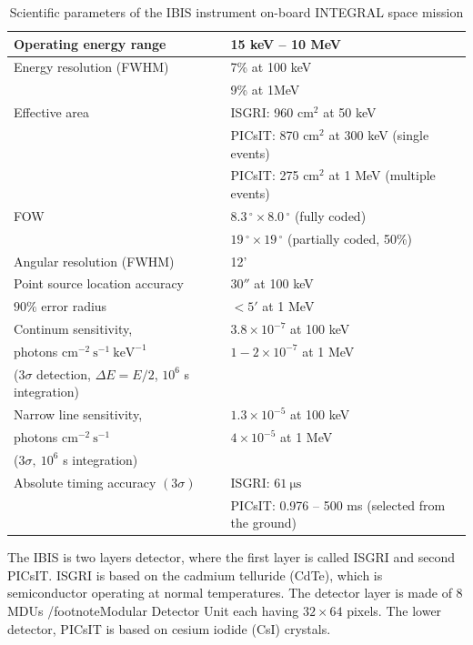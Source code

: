 \documentclass[oneside,a4paper,11pt]{report}
\begin{document}
\begin{table}[hbt!]\footnotesize
\begin{center}
\caption{Scientific parameters of the IBIS instrument on-board INTEGRAL space mission}
\begin{tabular}{|l|l|}
\hline
Operating energy range     & 15 keV -- 10 MeV\\
\hline
Energy resolution (FWHM)   & 7\% at 100 keV\\
                           & 9\% at 1MeV  \\
\hline
Effective area             & ISGRI: 960 $\mathrm{cm^2}$ at 50 keV \\
                           & PICsIT: 870 $\mathrm{cm^2}$ at 300 keV (single events)\\
                           & PICsIT: 275 $\mathrm{cm^2}$ at 1 MeV (multiple events)\\
\hline
FOW                        &$8.3\,^{\circ} \times 8.0\,^{\circ}$ (fully coded) \\
                           &$19\,^{\circ} \times 19\,^{\circ}$ (partially coded, 50\%)\\
\hline
Angular resolution (FWHM)  & 12' \\
\hline
Point source location accuracy & $30''$ at 100 keV \\
$90\%$ error radius      & $<5'$ at 1 MeV \\
\hline
Continum sensitivity, & $3.8 \times 10^{-7}$ at 100 keV \\
photons $\mathrm{cm^{-2}\: s^{-1}\: keV^{-1}}$ & $1 - 2 \times 10^{-7}$ at 1 MeV \\
($3 \sigma$ detection, $\Delta E = E/2$, $10^6$ s integration) &  \\
\hline
Narrow line sensitivity, & $1.3 \times 10^{-5}$ at 100 keV \\
photons $\mathrm{cm^{-2}\: s^{-1}}$ & $4 \times 10^{-5}$ at 1 MeV \\
($3\sigma,\:10^6$ s integration)&  \\
\hline
Absolute timing accuracy $(3 \sigma)$& ISGRI: $61 \:\mathrm{\mu s}$\\
 & PICsIT: 0.976 -- 500 ms (selected from the ground)\\
\hline
\end{tabular}
\end{center}
\end{table}

The IBIS is two layers detector, where the first layer is called ISGRI and second PICsIT. ISGRI is based 
on the cadmium telluride (CdTe), which is semiconductor operating at normal temperatures. The detector 
layer is made of 8 MDUs /footnote{Modular Detector Unit} each having $32\times64$ pixels. The lower 
detector, PICsIT is based on cesium iodide (CsI) crystals. 
\end{document}
